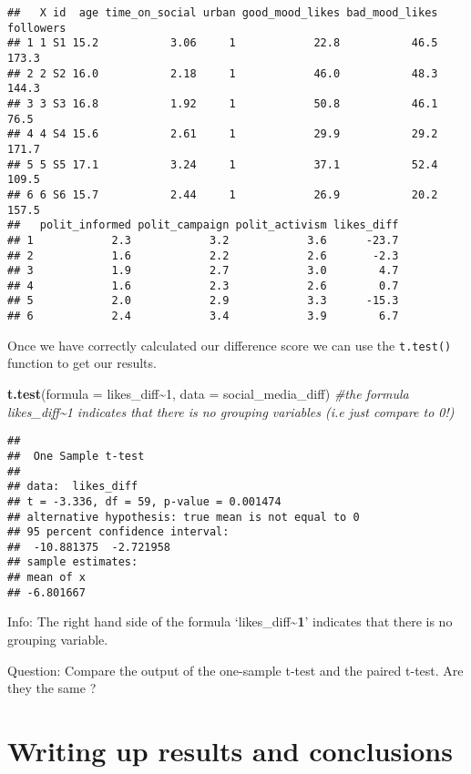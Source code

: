 \documentclass[
]{book}
\newenvironment{Shaded}{\begin{snugshade}}{\end{snugshade}}
\newcommand{\AttributeTok}[1]{\textcolor[rgb]{0.13,0.29,0.53}{#1}}
\newcommand{\CommentTok}[1]{\textcolor[rgb]{0.56,0.35,0.01}{\textit{#1}}}
\newcommand{\DecValTok}[1]{\textcolor[rgb]{0.00,0.00,0.81}{#1}}
\newcommand{\FunctionTok}[1]{\textcolor[rgb]{0.13,0.29,0.53}{\textbf{#1}}}
\newcommand{\NormalTok}[1]{#1}
\newcommand{\SpecialCharTok}[1]{\textcolor[rgb]{0.81,0.36,0.00}{\textbf{#1}}}
\begin{document}
\begin{verbatim}
##   X id  age time_on_social urban good_mood_likes bad_mood_likes followers
## 1 1 S1 15.2           3.06     1            22.8           46.5     173.3
## 2 2 S2 16.0           2.18     1            46.0           48.3     144.3
## 3 3 S3 16.8           1.92     1            50.8           46.1      76.5
## 4 4 S4 15.6           2.61     1            29.9           29.2     171.7
## 5 5 S5 17.1           3.24     1            37.1           52.4     109.5
## 6 6 S6 15.7           2.44     1            26.9           20.2     157.5
##   polit_informed polit_campaign polit_activism likes_diff
## 1            2.3            3.2            3.6      -23.7
## 2            1.6            2.2            2.6       -2.3
## 3            1.9            2.7            3.0        4.7
## 4            1.6            2.3            2.6        0.7
## 5            2.0            2.9            3.3      -15.3
## 6            2.4            3.4            3.9        6.7
\end{verbatim}

Once we have correctly calculated our difference score we can use the \texttt{t.test()} function to get our results.

\begin{Shaded}
\begin{Highlighting}[]
\FunctionTok{t.test}\NormalTok{(}\AttributeTok{formula =}\NormalTok{ likes\_diff}\SpecialCharTok{\textasciitilde{}}\DecValTok{1}\NormalTok{, }\AttributeTok{data =}\NormalTok{ social\_media\_diff) }\CommentTok{\#the formula likes\_diff\textasciitilde{}1 indicates that there is no grouping variables (i.e just compare to 0!)}
\end{Highlighting}
\end{Shaded}

\begin{verbatim}
## 
##  One Sample t-test
## 
## data:  likes_diff
## t = -3.336, df = 59, p-value = 0.001474
## alternative hypothesis: true mean is not equal to 0
## 95 percent confidence interval:
##  -10.881375  -2.721958
## sample estimates:
## mean of x 
## -6.801667
\end{verbatim}

Info: The right hand side of the formula `likes\_diff\textasciitilde{}\textbf{1}' indicates that there is no grouping variable.

Question: Compare the output of the one-sample t-test and the paired t-test. Are they the same ?

\section{Writing up results and conclusions}\label{writing-up-results-and-conclusions}
\end{document}
